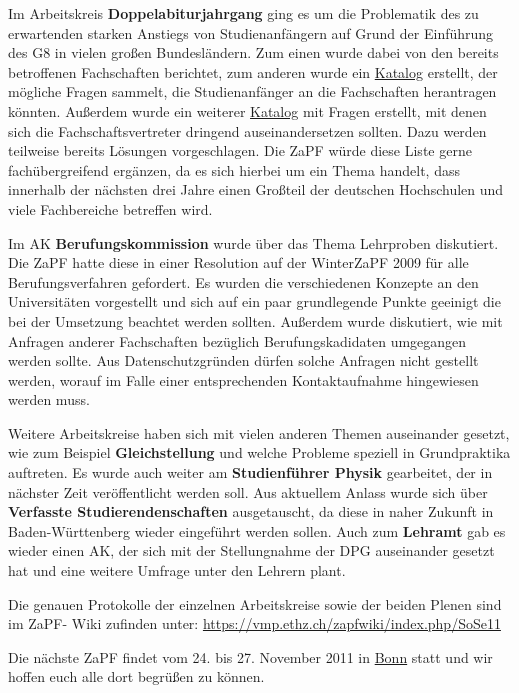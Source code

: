\documentclass{scrartcl}
\begin{document}
Im Arbeitskreis \textbf{Doppelabiturjahrgang} ging es um die Problematik des zu erwartenden starken Anstiegs von
Studienanfängern auf Grund der Einführung des G8 in vielen großen Bundesländern. Zum einen wurde dabei von den bereits
betroffenen Fachschaften berichtet, zum anderen wurde ein
\href{https://vmp.ethz.ch/zapfwiki/index.php/AK_Doppeljahrgang}{Katalog} erstellt, der mögliche Fragen sammelt, die
Studienanfänger an die Fachschaften herantragen könnten. Außerdem wurde ein weiterer
\href{https://vmp.ethz.ch/zapfwiki/index.php/AK_Doppeljahrgang}{Katalog} mit Fragen erstellt, mit denen sich die
Fachschaftsvertreter dringend auseinandersetzen sollten. Dazu werden teilweise bereits Lösungen vorgeschlagen. Die ZaPF
würde diese Liste gerne fachübergreifend ergänzen, da es sich hierbei um ein Thema handelt, dass innerhalb der nächsten
drei Jahre einen Großteil der deutschen Hochschulen und viele Fachbereiche betreffen wird.



Im AK \textbf{Berufungskommission} wurde über das Thema Lehrproben diskutiert. Die ZaPF hatte diese in einer
Resolution auf der WinterZaPF 2009 für alle Berufungsverfahren gefordert. Es
wurden die verschiedenen Konzepte an den Universitäten vorgestellt und sich auf ein paar grundlegende Punkte
geeinigt die bei der Umsetzung beachtet werden sollten. Außerdem wurde diskutiert, wie mit Anfragen anderer
Fachschaften bezüglich Berufungskadidaten umgegangen werden sollte. Aus Datenschutzgründen dürfen solche Anfragen
nicht gestellt werden, worauf im Falle einer entsprechenden Kontaktaufnahme hingewiesen werden muss.

Weitere Arbeitskreise haben sich mit vielen anderen Themen auseinander gesetzt, wie zum Beispiel
\textbf{Gleichstellung} und welche Probleme speziell in Grundpraktika auftreten. Es wurde auch weiter am
\textbf{Studienführer Physik} gearbeitet, der in nächster Zeit veröffentlicht werden soll. Aus aktuellem Anlass wurde
sich über \textbf{Verfasste Studierendenschaften} ausgetauscht, da diese in naher Zukunft in Baden-Württenberg wieder
eingeführt werden sollen. Auch zum \textbf{Lehramt} gab es wieder einen AK, der sich mit der Stellungnahme der DPG
auseinander gesetzt hat und eine weitere Umfrage unter den Lehrern plant.

Die genauen Protokolle der einzelnen Arbeitskreise sowie der beiden Plenen sind im ZaPF-
Wiki zufinden unter: \url{https://vmp.ethz.ch/zapfwiki/index.php/SoSe11}

\vspace{0.5cm}
Die nächste ZaPF findet vom 24. bis 27. November 2011 in \href{http://zapfibo.de}{Bonn} statt und wir hoffen euch alle
dort begrüßen zu können. 
\end{document}
